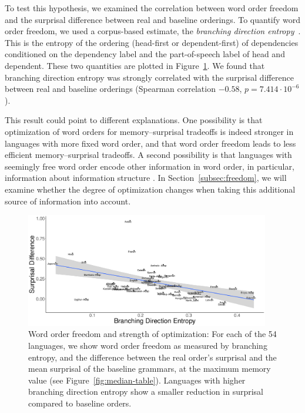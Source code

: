 To test this hypothesis, we examined the correlation between word order freedom and the surprisal difference between real and baseline orderings.
To quantify word order freedom, we used a corpus-based estimate, the \emph{branching direction entropy}~\citep{futrell-quantifying-2015}.
This is the entropy of the ordering (head-first or dependent-first) of dependencies conditioned on the dependency label and the part-of-speech label of head and dependent.
These two quantities are plotted in Figure~\ref{fig:freedom-surp}.
We found that branching direction entropy was strongly correlated with the surprisal difference between real and baseline orderings (Spearman correlation $-0.58$, $p = 7.414\cdot 10^{-6}$).

This result could point to different explanations.
One possibility is that optimization of word orders for memory--surprisal tradeoffs is indeed stronger in languages with more fixed word order, and that word order freedom leads to less efficient memory--surprisal tradeoffs.
A second possibility is that languages with seemingly free word order encode other information in word order, in particular, information about information structure \cite[e.g.]{givon1988pragmatics,firbas1966,definingfirbas1974aspects,myhill1985pragmatic}.
In Section~\ref{subsec:freedom}, we will examine whether the degree of optimization changes when taking this additional source of information into account.




\begin{figure}
\includegraphics[width=0.95\textwidth]{figures/surprisal-branching-entropy-REAL-invert.pdf}
	\caption{Word order freedom and strength of optimization: For each of the 54 languages, we show word order freedom as measured by branching entropy, and the difference between the real order's surprisal and the mean surprisal of the baseline grammars, at the maximum memory value (see Figure~\ref{fig:median-table}).
	Languages with higher branching direction entropy show a smaller reduction in surprisal compared to baseline orders.
	}\label{fig:freedom-surp}
\end{figure}


